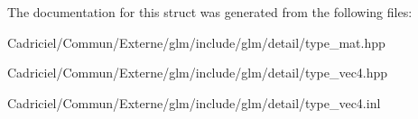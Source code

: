The documentation for this struct was generated from the following files\+:\begin{DoxyCompactItemize}
\item 
Cadriciel/\+Commun/\+Externe/glm/include/glm/detail/type\+\_\+mat.\+hpp\item 
Cadriciel/\+Commun/\+Externe/glm/include/glm/detail/type\+\_\+vec4.\+hpp\item 
Cadriciel/\+Commun/\+Externe/glm/include/glm/detail/type\+\_\+vec4.\+inl\end{DoxyCompactItemize}
